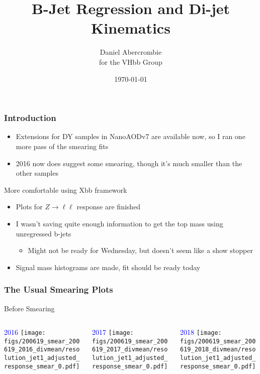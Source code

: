 \documentclass{beamer}
\author[D. Abercrombie]{
  Daniel Abercrombie \\
  for the VHbb Group
}
\title{\bf \sffamily B-Jet Regression and Di-jet Kinematics}
\date{\today}
\begin{document}
\begin{frame}
  \titlepage
\end{frame}

\begin{frame}
  \frametitle{Introduction}

  \begin{itemize}
  \item Extensions for DY samples in NanoAODv7 are available now,
    so I ran one more pass of the smearing fits
  \item 2016 now does suggest some smearing, though it's much smaller than the other samples
  \end{itemize}

  More comfortable using Xbb framework

  \begin{itemize}
  \item Plots for $Z\rightarrow \ell\ell$ response are finished
  \item I wasn't saving quite enough information to get the top mass using unregressed b-jets
    \begin{itemize}
    \item Might not be ready for Wednesday, but doesn't seem like a show stopper
    \end{itemize}
  \item Signal mass histograms are made,
    fit should be ready today
  \end{itemize}

\end{frame}

\begin{frame}
  \frametitle{The Usual Smearing Plots}

  \vfill
  \centering
  Before Smearing
  \vfill

  \begin{columns}
    \begin{column}{0.33\linewidth}
      \centering
      \textcolor{blue}{2016}
      \texttt{[image: figs/200619\_smear\_200619\_2016\_divmean/resolution\_jet1\_adjusted\_response\_smear\_0.pdf]}
    \end{column}
    \begin{column}{0.34\linewidth}
      \centering
      \textcolor{blue}{2017}
      \texttt{[image: figs/200619\_smear\_200619\_2017\_divmean/resolution\_jet1\_adjusted\_response\_smear\_0.pdf]}
    \end{column}
    \begin{column}{0.33\linewidth}
      \centering
      \textcolor{blue}{2018}
      \texttt{[image: figs/200619\_smear\_200619\_2018\_divmean/resolution\_jet1\_adjusted\_response\_smear\_0.pdf]}
    \end{column}
  \end{columns}

\end{frame}
\end{document}

